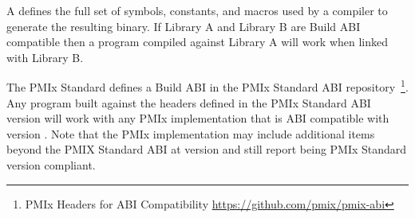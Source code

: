 A  defines the full set of symbols, constants, and macros used by a compiler to generate the resulting binary.
If Library A and Library B are Build ABI compatible then a program compiled against Library A will work when linked with Library B.

The PMIx Standard defines a Build ABI in the PMIx Standard ABI repository~\footnote{PMIx Headers for ABI Compatibility \url{https://github.com/pmix/pmix-abi}}.
Any program built against the headers defined in the PMIx Standard ABI version  will work with any PMIx implementation that is \ac{ABI} compatible with version .
Note that the PMIx implementation may include additional items beyond the PMIX Standard ABI at version  and still report being PMIx Standard version  compliant.




